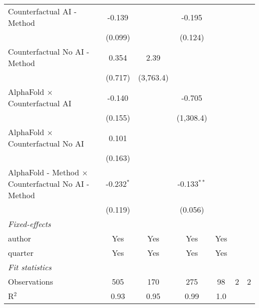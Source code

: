 \begin{tabular}{lcccccc}
   Counterfactual AI - Method                                 & -0.139       &              & -0.195        &           &     &   \\   
                                                              & (0.099)      &              & (0.124)       &           &     &   \\   
   Counterfactual No AI - Method                              & 0.354        & 2.39         &               &           &     &   \\   
                                                              & (0.717)      & (3,763.4)    &               &           &     &   \\   
   AlphaFold $\times$ Counterfactual AI                       & -0.140       &              & -0.705        &           &     &   \\   
                                                              & (0.155)      &              & (1,308.4)     &           &     &   \\   
   AlphaFold $\times$ Counterfactual No AI                    & 0.101        &              &               &           &     &   \\   
                                                              & (0.163)      &              &               &           &     &   \\   
   AlphaFold - Method $\times$ Counterfactual No AI - Method  & -0.232$^{*}$ &              & -0.133$^{**}$ &           &     &   \\   
                                                              & (0.119)      &              & (0.056)       &           &     &   \\   
   \midrule
   \emph{Fixed-effects}\\
   author                                                     & Yes          & Yes          & Yes           & Yes       &     & \\  
   quarter                                                    & Yes          & Yes          & Yes           & Yes       &     & \\  
   \midrule
   \emph{Fit statistics}\\
   Observations                                               & 505          & 170          & 275           & 98        & 2   & 2\\  
   R$^2$                                                      & 0.93         & 0.95         & 0.99          & 1.0       &     & \\  

\end{tabular}
